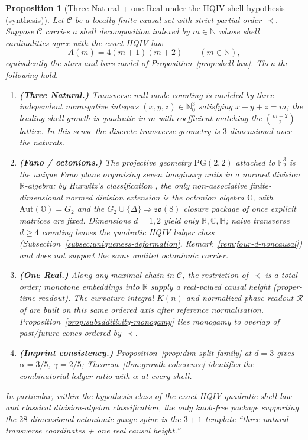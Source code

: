 \documentclass[11pt]{amsart}
\newtheorem{proposition}[theorem]{Proposition}
\begin{document}
\begin{proposition}[Three Natural + one Real under the HQIV shell hypothesis (synthesis)]
\label{thm:three-natural-one-real}
Let \(\mathcal{C}\) be a locally finite causal set with strict partial order \(\prec\). Suppose \(\mathcal{C}\) carries a shell decomposition indexed by \(m\in\mathbb{N}\) whose shell cardinalities agree with the exact HQIV law
\[
A(m)=4(m+1)(m+2)\qquad (m\in\mathbb{N}),
\]
equivalently the stars-and-bars model of Proposition~\ref{prop:shell-law}. Then the following hold.
\begin{enumerate}
  \item\label{it:three-natural} \textbf{(Three Natural.)} Transverse null-mode counting is modeled by three independent nonnegative integers \((x,y,z)\in\mathbb{N}_0^3\) satisfying \(x+y+z=m\); the leading shell growth is quadratic in \(m\) with coefficient matching the \(\binom{m+2}{2}\) lattice. In this sense the discrete transverse geometry is \(3\)-dimensional over the naturals.
  \item\label{it:octonion} \textbf{(Fano / octonions.)} The projective geometry \(\mathrm{PG}(2,2)\) attached to \(\mathbb{F}_2^3\) is the unique Fano plane organising seven imaginary units in a normed division \(\mathbb{R}\)-algebra; by Hurwitz's classification \cite{baez2002octonions,SpringerVeldkamp2000}, the only non-associative finite-dimensional normed division extension is the octonion algebra \(\mathbb{O}\), with \(\mathrm{Aut}(\mathbb{O})=G_2\) and the \(G_2\cup\{\Delta\}\Rightarrow \mathfrak{so}(8)\) closure package of \cite{hqiv-so8-paper} once explicit matrices are fixed. Dimensions \(d=1,2\) yield only \(\mathbb{R},\mathbb{C},\mathbb{H}\); naive transverse \(d\ge 4\) counting leaves the quadratic HQIV ledger class (Subsection~\ref{subsec:uniqueness-deformation}, Remark~\ref{rem:four-d-noncausal}) and does not support the same audited octonionic carrier.
  \item\label{it:one-real} \textbf{(One Real.)} Along any maximal chain in \(\mathcal{C}\), the restriction of \(\prec\) is a total order; monotone embeddings into \(\mathbb{R}\) supply a real-valued causal height (proper-time readout). The curvature integral \(K(n)\) and normalized phase readout \(\mathcal{R}\) of \cite{hqiv-so8-paper} are built on this same ordered axis after reference normalisation. Proposition~\ref{prop:subadditivity-monogamy} ties monogamy to overlap of past/future cones ordered by \(\prec\).
  \item\label{it:imprint} \textbf{(Imprint consistency.)} Proposition~\ref{prop:dim-split-family} at \(d=3\) gives \(\alpha=3/5\), \(\gamma=2/5\); Theorem~\ref{thm:growth-coherence} identifies the combinatorial ledger ratio with \(\alpha\) at every shell.
\end{enumerate}
In particular, within the hypothesis class of the exact HQIV quadratic shell law and classical division-algebra classification, the only knob-free package supporting the \(28\)-dimensional octonionic gauge spine is the \(3{+}1\) template ``three natural transverse coordinates + one real causal height.''
\end{proposition}
\end{document}
